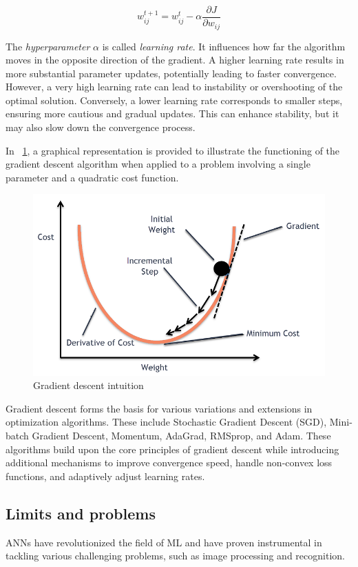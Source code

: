 \[
	w_{ij}^{t+1} = w_{ij}^t - \alpha\frac{\partial J}{\partial w_{ij}}
\]

The \textit{hyperparameter} $\alpha$ is called \textit{learning rate}. It influences how far the algorithm moves in the opposite direction of the gradient. A higher learning rate results in more substantial parameter updates, potentially leading to faster convergence. However, a very high learning rate can lead to instability or overshooting of the optimal solution. Conversely, a lower learning rate corresponds to smaller steps, ensuring more cautious and gradual updates. This can enhance stability, but it may also slow down the convergence process.

In \Fig~\ref{fig:graddesc}, a graphical representation is provided to illustrate the functioning of the gradient descent algorithm when applied to a problem involving a single parameter and a quadratic cost function.

\begin{figure}[h]
	\centering
	\includegraphics[width=0.6\linewidth]{ImageFiles/NeuralNetworks/graddesc}
	\caption{Gradient descent intuition \cite{GDAWML}}
	\label{fig:graddesc}
\end{figure}

Gradient descent forms the basis for various variations and extensions in optimization algorithms. These include Stochastic Gradient Descent (SGD), Mini-batch Gradient Descent, Momentum, AdaGrad, RMSprop, and Adam. These algorithms build upon the core principles of gradient descent while introducing additional mechanisms to improve convergence speed, handle non-convex loss functions, and adaptively adjust learning rates.

\subsection{Limits and problems}

ANNs have revolutionized the field of ML and have proven instrumental in tackling various challenging problems, such as image processing and recognition.

